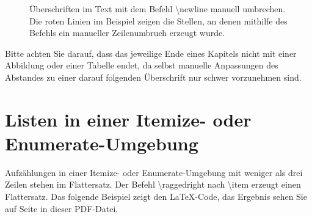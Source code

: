 
\begin{figure}[h]
	\caption{Überschriften im Text mit dem Befehl \glqq \textbackslash newline\grqq{} manuell umbrechen. Die roten Linien im Beispiel zeigen die Stellen, an denen mithilfe des Befehls ein manueller Zeilenumbruch erzeugt wurde.}
	\label{fig:ueberschrift-text-umbrechen}
\end{figure}

\newpage
Bitte achten Sie darauf, dass das jeweilige Ende eines Kapitels nicht mit einer Abbildung oder einer Tabelle endet, da selbst manuelle Anpassungen des Abstandes zu einer darauf folgenden Überschrift nur schwer vorzunehmen sind.





\section{Listen in einer Itemize- oder Enumerate-Umgebung}
Aufzählungen in einer Itemize- oder Enumerate-Umgebung mit weniger als drei Zeilen stehen im Flattersatz. Der Befehl
\glqq \textbackslash raggedright\grqq{} nach \glqq \textbackslash item\grqq{} erzeugt einen Flattersatz. Das folgende Beispiel zeigt den \LaTeX-Code, das Ergebnis sehen Sie auf Seite \pageref{itm:BeispielItemize} in dieser PDF-Datei.

